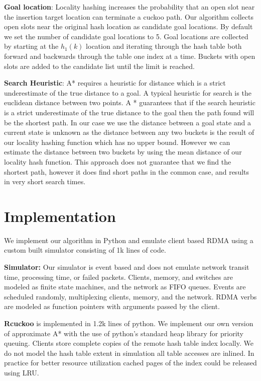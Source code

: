 \textbf{Goal location}: Locality hashing increases the
probability that an open slot near the insertion target
location can terminate a cuckoo path. Our algorithm collects
open slots near the original hash location as candidate goal
locations. By default we set the number of candidate goal
locations to 5. Goal locations are collected by starting at
the $h_1(k)$ location and iterating through the hash
table both forward and backwards through the table one index
at a time. Buckets with open slots are added to the
candidate list until the limit is reached. 


\textbf{Search Heuristic}: A* requires a heuristic for
distance which is a strict underestimate of the true
distance to a goal. A typical heuristic for search is the
euclidean distance between two points. A * guarantees that
if the search heuristic is a strict underestimate of the
true distance to the goal then the path found will be the
shortest path. In our case we use the distance between a
goal state and a current state is unknown as the distance
between any two buckets is the result of our locality
hashing function which has no upper bound. However we can
estimate the distance between two buckets by using the mean
distance of our locality hash function. This approach does
not guarantee that we find the shortest path, however it
does find short paths in the common case, and results in
very short search times.

\section{Implementation} We implement our algorithm in
Python and emulate client based RDMA using a custom built
simulator consisting of 1k lines of code. 

\textbf{Simulator:} Our simulator is event based and does
not emulate network transit time, processing time, or failed
packets. Clients, memory, and switches are modeled as finite
state machines, and the network as FIFO queues. Events are
scheduled randomly, multiplexing clients, memory, and the
network. RDMA verbs are modeled as function pointers with
arguments passed by the client.

\textbf{Rcuckoo} is implemented in 1.2k lines of
python. We implement our own version of approximate A* with
the use of python's standard heap library for priority
queuing. Clients store complete copies of the remote hash
table index locally. We do not model the hash table extent
in simulation all table accesses are inlined. In practice
for better resource utilization cached pages of the index
could be released using LRU. 

